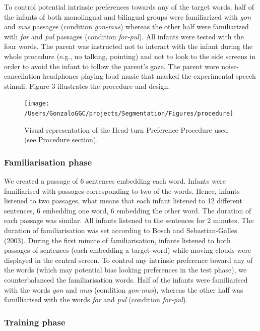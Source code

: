 \documentclass[man,floatsintext]{apa6}
\begin{document}
To control potential intrinsic preferences towards any of the target words, half of the infants of both monolingual and bilingual groups were familiarized with \emph{gon} and \emph{mus} passages (condition \emph{gon-mus}) whereas the other half were familiarized with \emph{for} and \emph{pul} passages (condition \emph{for-pul}). All infants were tested with the four words. The parent was instructed not to interact with the infant during the whole procedure (e.g., no talking, pointing) and not to look to the side screens in order to avoid the infant to follow the parent's gaze. The parent wore noise-cancellation headphones playing loud music that masked the experimental speech stimuli. Figure 3 illustrates the procedure and design.

\begin{figure}
\texttt{[image: /Users/GonzaloGGC/projects/Segmentation/Figures/procedure]} \caption{Visual representation of the Head-turn Preference Procedure used (see Procedure section).}\label{fig:procedure}
\end{figure}

\hypertarget{familiarisation-phase}{%
\subsubsection{Familiarisation phase}\label{familiarisation-phase}}

We created a passage of 6 sentences embedding each word. Infants were familiarised with passages corresponding to two of the words. Hence, infants listened to two passages, what means that each infant listened to 12 different sentences, 6 embedding one word, 6 embedding the other word. The duration of each passage was similar. All infants listened to the sentences for 2 minutes. The duration of familiarisation was set according to Bosch and Sebastian-Galles (2003). During the first minute of familiarisation, infants listened to both passages of sentences (each embedding a target word) while moving clouds were displayed in the central screen. To control any intrinsic preference toward any of the words (which may potential bias looking preferences in the test phase), we counterbalanced the familiarisation words. Half of the infants were familiarised with the words \emph{gon} and \emph{mus} (condition \emph{gon-mus}), whereas the other half was familliarised with the words \emph{for} and \emph{pul} (condition \emph{for-pul}).

\hypertarget{training-phase}{%
\subsubsection{Training phase}\label{training-phase}}
\end{document}
